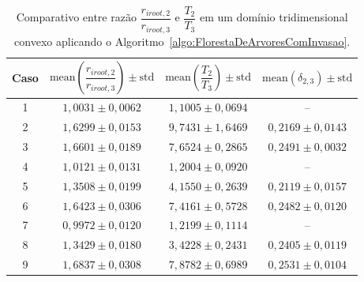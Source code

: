 \begin{table}[!htb]
  \centering
  \captiondelim{: }
  \caption{Comparativo entre razão $\dfrac{r_{iroot, 2}}{r_{iroot, 3}}$ e $\dfrac{T_2}{T_3}$ 
  em um domínio tridimensional convexo aplicando o Algoritmo~\ref{algo:FlorestaDeArvoresComInvasao}.}
\begin{tabular}{|c|c|c|c|}
\hline
Caso & $\textrm{mean}\left(\dfrac{r_{iroot, 2}}{r_{iroot, 3}}\right)\pm \textrm{std}$ & $\textrm{mean}\left(\dfrac{T_2}{T_3}\right) \pm \textrm{std}$ & $\textrm{mean}\left(\delta_{2,3}\right) \pm \textrm{std}$ \\ \hline
1 & $1,0031 \pm 0,0062$ & $1,1005 \pm 0,0694$ & -- \\ \hline
2 & $1,6299 \pm 0,0153$ & $9,7431 \pm 1,6469$ & $0,2169 \pm 0,0143$ \\ \hline
3 & $1,6601 \pm 0,0189$ & $7,6524 \pm 0,2865$ & $0,2491 \pm 0,0032$ \\ \hline
4 & $1,0121 \pm 0,0131$ & $1,2004 \pm 0,0920$ & -- \\ \hline
5 & $1,3508 \pm 0,0199$ & $4,1550 \pm 0,2639$ & $0,2119 \pm 0,0157$ \\ \hline
6 & $1,6423 \pm 0,0306$ & $7,4161 \pm 0,5728$ & $0,2482 \pm 0,0120$ \\ \hline
7 & $0,9972 \pm 0,0120$ & $1,2199 \pm 0,1114$ & -- \\ \hline
8 & $1,3429 \pm 0,0180$ & $3,4228 \pm 0,2431$ & $0,2405 \pm 0,0119$ \\ \hline
9 & $1,6837 \pm 0,0308$ & $7,8782 \pm 0,6989$ & $0,2531 \pm 0,0104$ \\ \hline
\end{tabular}
  \label{tab:resultados-lei-alometrica-floresta-com-coeficiente-de-invasao-3arvores-3d-parte3}
\end{table}

\clearpage

